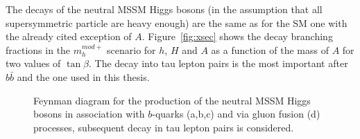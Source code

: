 The decays of the neutral
MSSM Higgs bosons (in the assumption that all supersymmetric particle
are heavy enough) are the same as for the SM one with the already
cited exception of $A$. Figure~\ref{fig:xsec} shows the decay branching fractions in the $m_h^{mod+}$ scenario
for $h$, $H$ and $A$ as a function of the mass of $A$ for two values of $\tan \beta$. The decay into tau lepton 
pairs is the most important after $b\bar{b}$ and the one used in this thesis. 

\begin{figure}[tp]
     \begin{center}
     \hspace{0.2cm}	
     	\hspace{0.2cm}	
     \end{center}
    \caption{Feynman diagram for the production of the neutral MSSM Higgs bosons in association with  $b$-quarks (a,b,c) and via gluon fusion (d) 
	processes, subsequent decay in tau lepton pairs is considered.}
   \label{fig:prod}
\end{figure}

